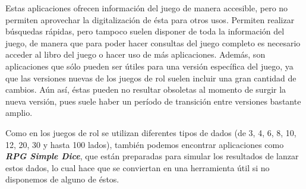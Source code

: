 \newpage

Estas aplicaciones ofrecen información del juego de manera accesible, pero no permiten aprovechar la 
digitalización de ésta para otros usos. Permiten realizar búsquedas rápidas, pero tampoco suelen disponer de 
toda la información del juego, de manera que para poder hacer consultas del juego completo es necesario 
acceder al libro del juego o hacer uso de más aplicaciones. Además, son aplicaciones que sólo pueden 
ser útiles para una versión específica del juego, ya que las versiones nuevas de los juegos de rol suelen 
incluir una gran cantidad de cambios. Aún así, éstas pueden no resultar obsoletas al momento de surgir la 
nueva versión, pues suele haber un período de transición entre versiones bastante amplio.\medskip

Como en los juegos de rol se utilizan diferentes tipos de dados 
(de 3, 4, 6, 8, 10, 12, 20, 30 y hasta 100 lados), también podemos encontrar aplicaciones 
como \textit{\textbf{RPG Simple Dice}}, que están preparadas para simular los resultados 
de lanzar estos dados, lo cual hace que se conviertan en una herramienta útil si no 
disponemos de alguno de éstos. \vspace{1cm}

